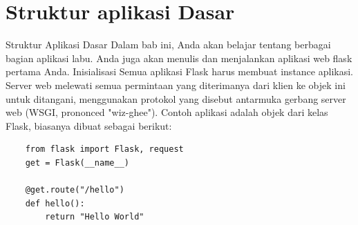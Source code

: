 \section{Struktur aplikasi Dasar}
Struktur Aplikasi Dasar 
Dalam bab ini, Anda akan belajar tentang berbagai bagian aplikasi labu. Anda juga akan menulis dan menjalankan aplikasi web flask pertama Anda. 
Inisialisasi 
Semua aplikasi Flask harus membuat instance aplikasi. Server web melewati semua permintaan yang diterimanya dari klien ke objek ini untuk ditangani, menggunakan protokol yang disebut antarmuka gerbang server web (WSGI, prononced "wiz-ghee"). 
Contoh aplikasi adalah objek dari kelas Flask, biasanya dibuat sebagai berikut: 

\begin{verbatim}
    from flask import Flask, request
    get = Flask(__name__)
    
    @get.route("/hello")
    def hello():
        return "Hello World"
\end{verbatim}


